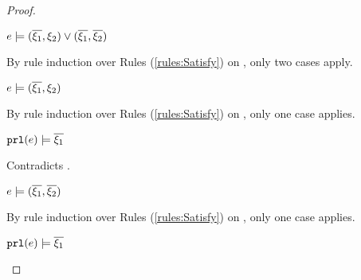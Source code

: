 \begin{proof}
\begin{byCases}
\begin{byCases}
\begin{byCases}
\begin{byCases}
                \begin{pfsteps*}
                \item $e \models (\overline{\xi_1} , \xi_2) \vee (\overline{\xi_1} , \overline{\xi_2})$  
                \end{pfsteps*}
                By rule induction over Rules (\ref{rules:Satisfy}) on , only two cases apply.
                \begin{byCases}
                \item[\text{(\ref{rule:CSOr1})}]
                    \begin{pfsteps*}
                    \item $e \models (\overline{\xi_1} , \xi_2)$  
                    \end{pfsteps*}
                    By rule induction over Rules (\ref{rules:Satisfy}) on , only one case applies.
                    \begin{byCases}
                    \item[\text{(\ref{rule:CSNotValPair})}]
                        \begin{pfsteps*}
                        \item $\mathtt{prl}(e) \models \overline{\xi_1}$ 
                        \end{pfsteps*}
                        Contradicts .
                    \end{byCases}
                \item[\text{(\ref{rule:CSOr2})}]
                    \begin{pfsteps*}
                    \item $e \models (\overline{\xi_1} , \overline{\xi_2})$  
                    \end{pfsteps*}
                    By rule induction over Rules (\ref{rules:Satisfy}) on , only one case applies.
                    \begin{byCases}
                    \item[\text{(\ref{rule:CSNotValPair})}]
                        \begin{pfsteps*}
                        \item $\mathtt{prl}(e) \models \overline{\xi_1}$ 

\end{pfsteps*}
\end{byCases}
\end{byCases}
\end{byCases}
\end{byCases}
\end{byCases}
\end{byCases}
\end{proof}
